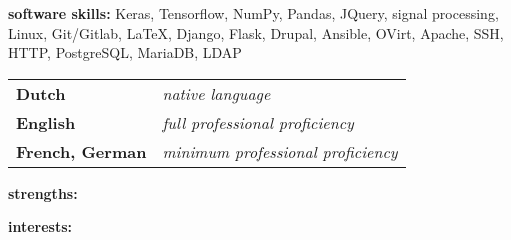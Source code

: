 \divider

\textbf{software skills:}  Keras, Tensorflow, NumPy, Pandas, JQuery, signal processing, Linux, Git/Gitlab, \LaTeX, Django, Flask, Drupal, Ansible, OVirt, Apache, SSH, HTTP, PostgreSQL,
MariaDB, LDAP

\divider

\begin{tabular}{p{2.5cm} p{4cm}}
\textbf{Dutch} & \textit{native language} \\
\textbf{English} & \textit{full professional proficiency}\\
\textbf{French, German} &\textit{minimum professional \newline proficiency}
\end{tabular}


\textbf{strengths:} \smallskip  \newline
{}

\divider

\textbf{interests:} \smallskip \newline
{}


